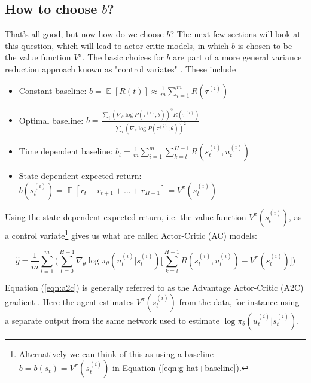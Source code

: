 \documentclass[11pt, oneside]{article}                          %
\DeclareMathOperator{\E}{\mathbb{E}}
\begin{document}
\subsection{How to choose $b$?}
\label{seq:choosing_b}
That's all good, but now how do we choose $b$? The next few
sections will look at this question, which will lead to
actor-critic models, in which $b$ is chosen to be the value
function $V^\pi$. The basic choices for $b$ are part of a more
general variance reduction approach known as "control variates"
\cite{Greensmith:2004:VRT:1005332.1044710}. These include

\begin{itemize}
\item Constant baseline: $b = \E [R(t)] \approx \frac{1}{m} \sum\limits_{i = 1}^{m} R(\tau^{(i)})$ \\
\item Optimal baseline: $b = \frac{\sum\limits_i (\nabla_\theta \log P(\tau^{(i)}; \theta))^2 R(\tau^{(i)})}
{\sum\limits_i (\nabla_\theta \log P(\tau^{(i)}; \theta))^2}$
\item Time dependent baseline: $b_t = \frac{1}{m} \sum\limits_{i = 1}^{m} \sum\limits_{k = t}^{H -1} R(s^{(i)}_t, u^{(i)}_t)$
\item State-dependent expected return: $b(s^{(i)}_t) = \E[r_t + r_{t + 1} + \hdots + r_{H - 1}] = V^{\pi}(s^{(i)}_t)$
\end{itemize}

\bigskip
\noindent
Using the state-dependent expected return, i.e. the value
function $V^\pi(s^{(i)}_t)$, as a control
variate\footnote{Alternatively we can think of this as using a
baseline $b = b(s_t) = V^{\pi}(s^{(i)}_t)$ in Equation
(\ref{eqn:g-hat+baseline}).} gives us what are called Actor-Critic
(AC) models:

\bigskip
\begin{equation}
\hat{g} = \frac{1}{m} \sum\limits_{i = 1}^{m} \Bigg ( \sum\limits_{t = 0}^{H - 1} \nabla_{\theta} \log \pi_{\theta} (u^{(i)}_t | s^{(i)}_t) \Bigg [
 \sum\limits_{k = t}^{H - 1} R(s^{(i)}_t, u^{(i)}_t) 
- V^{\pi}(s^{(i)}_t) \Bigg ] \Bigg )
\label{eqn:a2c}
\end{equation}

\bigskip
\noindent
Equation (\ref{eqn:a2c}) is generally referred to as the Advantage
Actor-Critic (A2C) gradient \cite{2018arXiv180302811S}. Here the
agent estimates $V^\pi (s^{(i)}_t)$ from the data, for instance
using a separate output from the same network used to estimate
$\log \pi_{\theta} (u^{(i)}_t | s^{(i)}_t)$.
\end{document}
